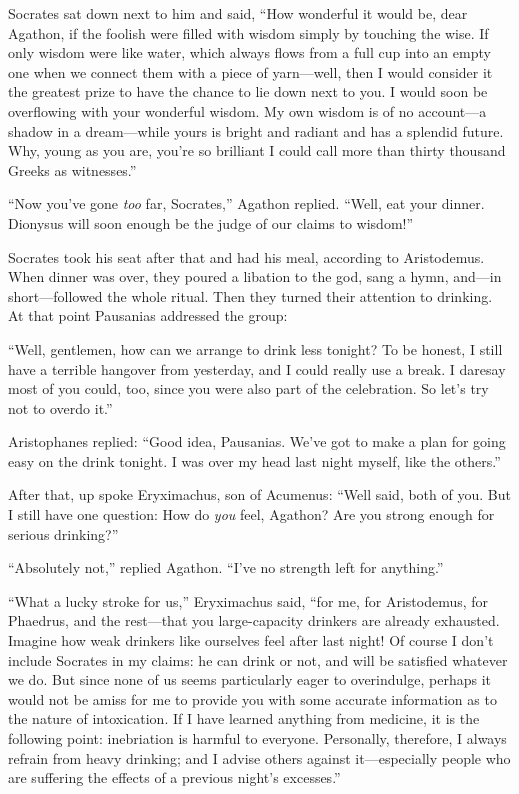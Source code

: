 Socrates sat down next to him and said, “How wonderful it would be, dear
Agathon, if the foolish were filled with wisdom simply by touching the
wise. If only wisdom were like water, which always flows from a full cup
into an empty one when we connect them with a piece of yarn---well, 
then I would consider it the greatest prize to have the chance
to lie down next to you. I would soon be overflowing with your wonderful
wisdom. My own wisdom is of no account---a shadow in a dream---while
yours is bright and radiant and has a splendid future. Why, young as you
are, you're so brilliant I could call more than thirty thousand Greeks
as witnesses.”

“Now you've gone {\em too} far, Socrates,” Agathon replied. “Well, eat
your dinner. Dionysus will soon enough be the judge of our claims to
wisdom!”

Socrates took his seat after that and had his meal, according to
Aristodemus. When dinner was over, they poured a libation to the god,
sang a hymn, and---in short---followed the whole ritual. Then they
turned their attention to drinking. At that point Pausanias addressed
the group:

“Well, gentlemen, how can we arrange to drink less tonight? To be
honest, I still have a terrible hangover from yesterday, and I could
really use a break. I daresay most of you could, too, since you were
also part of the celebration. So let's try not to overdo it.”

Aristophanes replied: “Good idea, Pausanias. We've got to make a plan
for going easy on the drink tonight. I was over my head last night
myself, like the others.”

After that, up spoke Eryximachus, son of Acumenus: “Well said, both of
you. But I still have one question: How do {\em you} feel, Agathon? Are
you strong enough for serious drinking?”

“Absolutely not,” replied Agathon. “I've no strength left for anything.”

“What a lucky stroke for us,” Eryximachus said, “for me, for
Aristodemus, for Phaedrus, and the rest---that you large-capacity
drinkers are already exhausted. Imagine how weak drinkers like ourselves
feel after last night! Of course I don't include Socrates in my claims:
he can drink or not, and will be satisfied whatever we do. But since
none of us seems particularly eager to overindulge, perhaps it would not
be amiss for me to provide you with some accurate information as
to the nature of intoxication. If I have learned anything from medicine,
it is the following point: inebriation is harmful to everyone.
Personally, therefore, I always refrain from heavy drinking; and I
advise others against it---especially people who are suffering the
effects of a previous night's excesses.”


